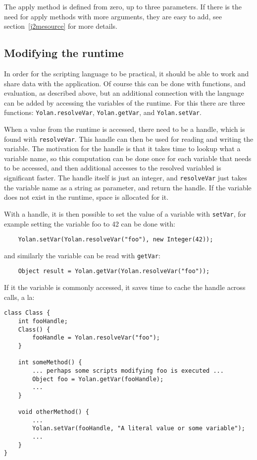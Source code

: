 The apply method is defined from zero, up to three parameters. If there is the need for apply methods with more arguments, they are easy to add, see section~\ref{j2mesource} for more details.

\subsection{Modifying the runtime}

In order for the scripting language to be practical, it should be able to work and share data with the application. 
Of course this can be done with functions, and evaluation, as described above, but an additional connection with the language can be added by accessing the variables of the runtime.
For this there are three functions: \verb|Yolan.resolveVar|, \verb|Yolan.getVar|, and \verb|Yolan.setVar|.

When a value from the runtime is accessed, there need to be a handle, which is found with \verb|resolveVar|. This handle can then be used for reading and writing the variable. The motivation for the handle is that it takes time to lookup what a variable name, so this computation can be done once for each variable that needs to be accessed, and then additional accesses to the resolved variabled is significant faster. The handle itself is just an integer, and \verb|resolveVar| just takes the variable name as a string as parameter, and return the handle. If the variable does not exist in the runtime, space is allocated for it.

With a handle, it is then possible to set the value of a variable with \verb|setVar|, for example setting the variable foo to 42 can be done with:
{\scriptsize 
\begin{verbatim}
    Yolan.setVar(Yolan.resolveVar("foo"), new Integer(42));
\end{verbatim}
}
and similarly the variable can be read with \verb|getVar|:
{\scriptsize 
\begin{verbatim}
    Object result = Yolan.getVar(Yolan.resolveVar("foo"));
\end{verbatim}
}

If it the variable is commonly accessed, it saves time to cache the handle across calls, a la:
{\scriptsize 
\begin{verbatim}
class Class {
    int fooHandle;
    Class() {
        fooHandle = Yolan.resolveVar("foo");
    }

    int someMethod() {
        ... perhaps some scripts modifying foo is executed ...
        Object foo = Yolan.getVar(fooHandle);
        ...
    }

    void otherMethod() {
        ... 
        Yolan.setVar(fooHandle, "A literal value or some variable");
        ...
    }
}
\end{verbatim}
}

